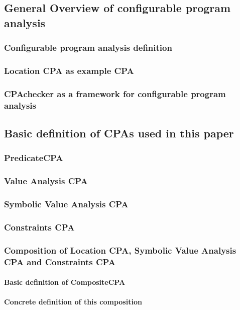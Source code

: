 \subsection{General Overview of configurable program analysis}
\subsubsection{Configurable program analysis definition}
\subsubsection{Location CPA as example CPA}
\subsubsection{CPAchecker as a framework for configurable program analysis}

\subsection{Basic definition of CPAs used in this paper}
\subsubsection{PredicateCPA}
\subsubsection{Value Analysis CPA}
\subsubsection{Symbolic Value Analysis CPA}
\subsubsection{Constraints CPA}
\subsubsection{Composition of Location CPA, Symbolic Value Analysis CPA and Constraints CPA}
\paragraph{Basic definition of CompositeCPA}
\paragraph{Concrete definition of this composition}

